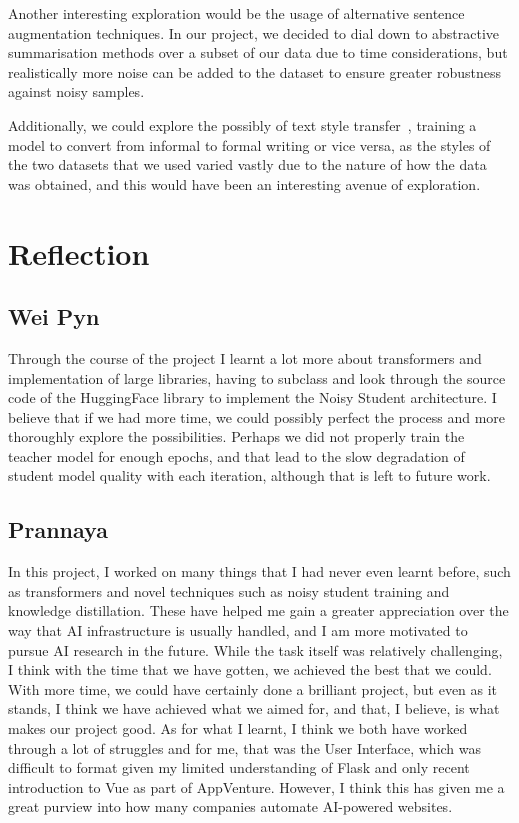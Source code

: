 \documentclass[12pt]{article}
\begin{document}
{Another interesting exploration would be the usage of alternative sentence augmentation techniques. In our project, we decided to dial down to abstractive summarisation methods over a subset of our data due to time considerations, but realistically more noise can be added to the dataset to ensure greater robustness against noisy samples.

Additionally, we could explore the possibly of text style transfer~\cite{styletransfersurvey,deeplearningtextstyletransfer}, training a model to convert from informal to formal writing or vice versa, as the styles of the two datasets that we used varied vastly due to the nature of how the data was obtained, and this would have been an interesting avenue of exploration.

\newpage
\section{Reflection}

\subsection{Wei Pyn}
Through the course of the project I learnt a lot more about transformers and implementation of large libraries, having to subclass and look through the source code of the HuggingFace library to implement the Noisy Student architecture. I believe that if we had more time, we could possibly perfect the process and more thoroughly explore the possibilities. Perhaps we did not properly train the teacher model for enough epochs, and that lead to the slow degradation of student model quality with each iteration, although that is left to future work.

\subsection{Prannaya}
In this project, I worked on many things that I had never even learnt before, such as transformers and novel techniques such as noisy student training and knowledge distillation. These have helped me gain a greater appreciation over the way that AI infrastructure is usually handled, and I am more motivated to pursue AI research in the future. While the task itself was relatively challenging, I think with the time that we have gotten, we achieved the best that we could. With more time, we could have certainly done a brilliant project, but even as it stands, I think we have achieved what we aimed for, and that, I believe, is what makes our project good. As for what I learnt, I think we both have worked through a lot of struggles and for me, that was the User Interface, which was difficult to format given my limited understanding of Flask and only recent introduction to Vue as part of AppVenture. However, I think this has given me a great purview into how many companies automate AI-powered websites.

}
\end{document}
